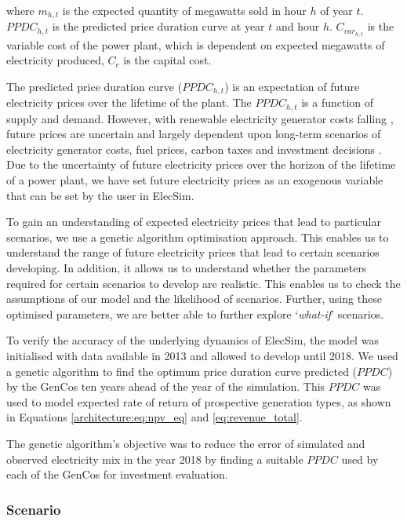 \noindent where $m_{h,t}$ is the expected quantity of megawatts sold in hour $h$ of year $t$. $PPDC_{h,t}$ is the predicted price duration curve at year $t$ and hour $h$. $C_{var_{h,t}}$ is the variable cost of the power plant, which is dependent on expected megawatts of electricity produced, $C_c$ is the capital cost.

The predicted price duration curve ($PPDC_{h,t}$) is an expectation of future electricity prices over the lifetime of the plant. The $PPDC_{h,t}$ is a function of supply and demand. However, with renewable electricity generator costs falling  \cite{IRENA2014}, future prices are uncertain and largely dependent upon long-term scenarios of electricity generator costs, fuel prices, carbon taxes and investment decisions \cite{IRENA2014}. Due to the uncertainty of future electricity prices over the horizon of the lifetime of a power plant, we have set future electricity prices as an exogenous variable that can be set by the user in ElecSim. 


To gain an understanding of expected electricity prices that lead to particular scenarios, we use a genetic algorithm optimisation approach. This enables us to understand the range of future electricity prices that lead to certain scenarios developing. In addition, it allows us to understand whether the parameters required for certain scenarios to develop are realistic. This enables us to check the assumptions of our model and the likelihood of scenarios. Further, using these optimised parameters, we are better able to further explore `\textit{what-if}' scenarios.



To verify the accuracy of the underlying dynamics of ElecSim, the model was initialised with data available in 2013 and allowed to develop until 2018. We used a genetic algorithm to find the optimum price duration curve predicted ($PPDC$) by the GenCos ten years ahead of the year of the simulation. This $PPDC$ was used to model expected rate of return of prospective generation types, as shown in Equations \ref{architecture:eq:npv_eq} and \ref{eq:revenue_total}. 

The genetic algorithm's objective was to reduce the error of simulated and observed electricity mix in the year 2018 by finding a suitable $PPDC$ used by each of the GenCos for investment evaluation.

\subsubsection{Scenario}

